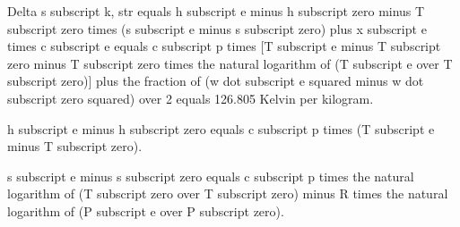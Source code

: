 Delta s subscript k, str equals h subscript e minus h subscript zero minus T subscript zero times (s subscript e minus s subscript zero) plus x subscript e times c subscript e equals c subscript p times [T subscript e minus T subscript zero minus T subscript zero times the natural logarithm of (T subscript e over T subscript zero)] plus the fraction of (w dot subscript e squared minus w dot subscript zero squared) over 2 equals 126.805 Kelvin per kilogram.

h subscript e minus h subscript zero equals c subscript p times (T subscript e minus T subscript zero).

s subscript e minus s subscript zero equals c subscript p times the natural logarithm of (T subscript zero over T subscript zero) minus R times the natural logarithm of (P subscript e over P subscript zero).